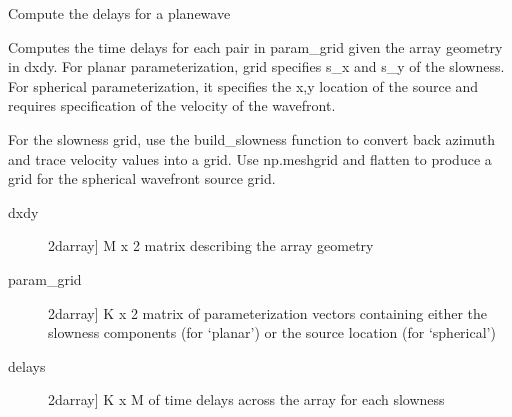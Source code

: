 \documentclass[letterpaper,10pt,english]{sphinxmanual}
\begin{document}
\begin{fulllineitems}
\label{\detokenize{infrapy.detection:infrapy.detection.beamforming_new.compute_beam_power_wrapper}}
\end{fulllineitems}


\begin{fulllineitems}
\label{\detokenize{infrapy.detection:infrapy.detection.beamforming_new.compute_delays}}
Compute the delays for a planewave

Computes the time delays for each pair in param\_grid given the
array geometry in dxdy.  For planar parameterization, grid
specifies s\_x and s\_y of the slowness.  For spherical
parameterization, it specifies the x,y location of the source
and requires specification of the velocity of the wavefront.

For the slowness grid, use the build\_slowness function to
convert back azimuth and trace velocity values into a grid.
Use np.meshgrid and flatten to produce a grid for the
spherical wavefront source grid.
\begin{description}
\item[{dxdy}] \leavevmode{[}2darray{]}
M x 2 matrix describing the array geometry

\item[{param\_grid}] \leavevmode{[}2darray{]}
K x 2 matrix of parameterization vectors containing
either the slowness components (for ‘planar’) or
the source location (for ‘spherical’)

\end{description}
\begin{description}
\item[{delays}] \leavevmode{[}2darray{]}
K x M of time delays across the array for each slowness

\end{description}

\end{fulllineitems}
\end{document}
